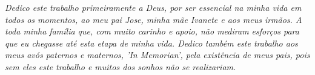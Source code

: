 \begin{dedicatoria}
   \vspace*{\fill}
   \centering
   \noindent
   \textit{Dedico este trabalho primeiramente a Deus, por ser essencial na minha vida em todos os momentos, ao meu pai Jose, minha mãe Ivanete e aos meus irmãos. A toda minha família que, com muito carinho e apoio, não mediram esforços para que eu chegasse até esta etapa de minha vida. Dedico também este trabalho aos meus avós paternos e maternos, ’In Memorian’, pela existência de meus pais, pois sem eles este trabalho e muitos dos sonhos não se realizariam.} 
	 \vspace*{\fill}
\end{dedicatoria}